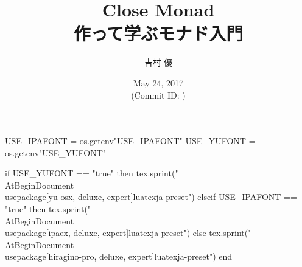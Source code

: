 \hypersetup{colorlinks,linkcolor=,urlcolor=links}

\beamertemplatenavigationsymbolsempty


\usepackage{luacode}
\usepackage{luatexja}
\usepackage{pgfpages}

\begin{luacode*}
  USE_IPAFONT = os.getenv"USE_IPAFONT"
  USE_YUFONT = os.getenv"USE_YUFONT"
  
  if USE_YUFONT == "true" then
    tex.sprint("\\AtBeginDocument{\\usepackage[yu-osx, deluxe, expert]{luatexja-preset}}")
  elseif USE_IPAFONT == "true" then
    tex.sprint("\\AtBeginDocument{\\usepackage[ipaex, deluxe, expert]{luatexja-preset}}")
  else
    tex.sprint("\\AtBeginDocument{\\usepackage[hiragino-pro, deluxe, expert]{luatexja-preset}}")
  end
\end{luacode*}

\usepackage{epigraph}
\usepackage{etoolbox}
\usepackage{tikz}
\usepackage{framed}
\usepackage{libertine}
\usepackage{amsmath}
\usepackage{mathtools}
\usepackage{listings}
\usepackage{tikz-qtree}

\renewcommand{\kanjifamilydefault}{\gtdefault}


\setmainfont[Ligatures=TeX]{Linux Libertine O}
\setsansfont[Ligatures=TeX]{CMU Sans Serif}
\setmonofont[Ligatures=TeX]{CMU Typewriter Text}



\title[Close Monad]{%
  {\LARGE Close Monad}\\
  {\normalsize 作って学ぶモナド入門}
}
\author{吉村 優}
\date[May 24, 2017]{%
  May 24, 2017 \\%
  {\footnotesize (Commit ID: \GITAbrHash)}
}






